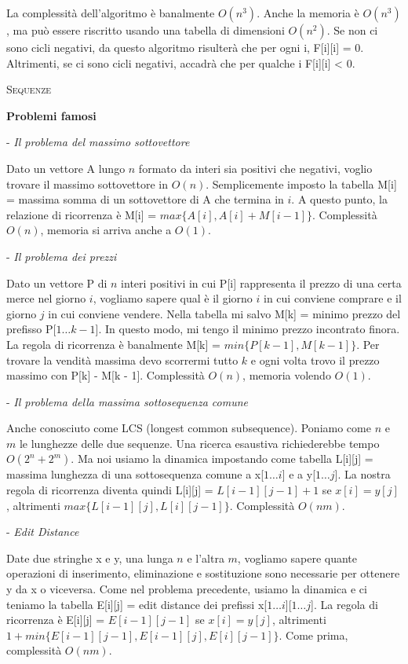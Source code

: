\documentclass[a4paper,10pt]{article} %
\newcommand{\msection}[1]{%
    {\newpage\bigbreak \bigbreak \par \hfil \huge \textsc {#1}}\par}
\renewcommand{\b}[1]{%
    {\textbf{#1}}}
\begin{document}
La complessità dell'algoritmo è banalmente $O(n^3)$. Anche la memoria è $O(n^3)$, ma può essere riscritto usando una tabella di dimensioni $O(n^2)$. Se non ci sono cicli negativi, da questo algoritmo risulterà che per ogni i, F[i][i] = 0. Altrimenti, se ci sono cicli negativi, accadrà che per qualche i F[i][i] < 0.



\msection{Sequenze}
\bigskip


\centerline{\b{Problemi famosi}}
\bigskip

- \emph{ Il problema del massimo sottovettore}\par
Dato un vettore A lungo $n$ formato da interi sia positivi che negativi, voglio trovare il massimo sottovettore in $O(n)$. Semplicemente imposto la tabella M[i] = massima somma di un sottovettore di A che termina in $i$. A questo punto, la relazione di ricorrenza è M[i] = $max\{A[i], A[i] + M[i - 1]\}$. Complessità $O(n)$, memoria si arriva anche a $O(1)$.
\bigskip

- \emph{ Il problema dei prezzi }\par
Dato un vettore P di $n$ interi positivi in cui P[i] rappresenta il prezzo di una certa merce nel giorno $i$, vogliamo sapere qual è il giorno $i$ in cui conviene comprare e il giorno $j$ in cui conviene vendere. Nella tabella mi salvo M[k] = minimo prezzo del prefisso P[$1 \ldots k - 1$]. In questo modo, mi tengo il minimo prezzo incontrato finora. La regola di ricorrenza è banalmente M[k] = $min\{P[k- 1], M[k - 1]\}$. Per trovare la vendità massima devo scorrermi tutto $k$ e ogni volta trovo il prezzo massimo con P[k] - M[k - 1]. Complessità $O(n)$, memoria volendo $O(1)$.
\bigskip

- \emph{ Il problema della massima sottosequenza comune }\par
Anche conosciuto come LCS (longest common subsequence). Poniamo come $n$ e $m$ le lunghezze delle due sequenze. Una ricerca esaustiva richiederebbe tempo $O(2^n + 2^m)$. Ma noi usiamo la dinamica impostando come tabella L[i][j] = massima lunghezza di una sottosequenza comune a x[$1 \ldots i$] e a y[$1 \ldots j$]. La nostra regola di ricorrenza diventa quindi L[i][j] = $L[i - 1][j - 1] + 1$ se $x[i] = y[j]$, altrimenti $max\{L[i-1][j], L[i][j-1]\}$. Complessità $O(nm)$.
\bigskip

- \emph{ Edit Distance }\par
Date due stringhe x e y, una lunga $n$ e l'altra $m$, vogliamo sapere quante operazioni di inserimento, eliminazione e sostituzione sono necessarie per ottenere y da x o viceversa. Come nel problema precedente, usiamo la dinamica e ci teniamo la tabella E[i][j] = edit distance dei prefissi x[$1 \ldots i$][$1 \ldots j$]. La regola di ricorrenza è E[i][j] = $E[i - 1][j - 1]$ se $x[i] = y[j]$, altrimenti $1 + min\{E[i - 1][j - 1], E[i - 1][j], E[i][j - 1]\}$. Come prima, complessità $O(nm)$.
\bigskip
\end{document}
